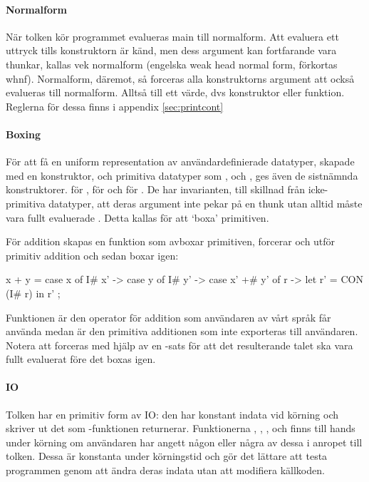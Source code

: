 \documentclass[../Core]{subfiles}
\begin{document}

\paragraph{Normalform}
\label{sec:whnf}
\label{sec:nf}

När tolken kör programmet evalueras main till normalform.
Att evaluera ett uttryck tills konstruktorn är känd, men dess argument kan 
fortfarande vara thunkar, kallas vek normalform 
(engelska weak head normal form, förkortas whnf). Normalform, däremot, så
forceras alla konstruktorns argument att också evalueras till normalform.
Alltså till ett värde, dvs konstruktor eller funktion. Reglerna för dessa
finns i appendix \ref{sec:printcont}

\paragraph{Boxing}
\label{sec:boxing}

För att få en uniform representation av användardefinierade datatyper, skapade
med en konstruktor, och primitiva datatyper som ,  och , ges även 
de sistnämnda konstruktorer.  för ,  för  och 
 för . De har invarianten, till skillnad från icke-primitiva datatyper, 
att deras argument inte pekar på en thunk utan alltid måste vara fullt evaluerade  \cite{santos}. 
Detta kallas för att `boxa' primitiven.

    För addition skapas en funktion som avboxar primitiven,
forcerar och utför primitiv addition och sedan boxar igen:

\begin{codeEx}
x + y = case x of 
    { I# x' -> case y of
        { I# y' -> case x' +# y' of
            { r -> let r' = CON (I# r) 
                   in  r'
    }   }   };
\end{codeEx}

Funktionen \ic{+} är den operator för addition som användaren av vårt språk 
får använda medan \ic{+\#} är den primitiva additionen som inte exporteras till 
användaren. Notera att 
forceras med hjälp av en -sats för att det resulterande talet ska vara fullt
evaluerat före det boxas igen.

\paragraph{IO}
Tolken har en primitiv form av IO: den har konstant indata vid körning och
skriver ut det som -funktionen returnerar. Funktionerna 
, 
,
,
 och 
finns till hands under körning om användaren har angett någon eller några av
dessa i anropet till tolken. Dessa är konstanta under körningstid och gör det
lättare att testa programmen genom att ändra deras indata utan att modifiera
källkoden.
\end{document}
